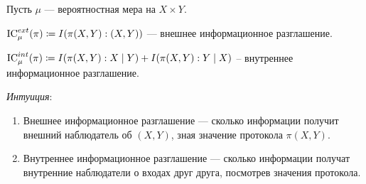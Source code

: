 
\dotfill

\begin{defn}
Пусть $  \mu$ --- вероятностная мера на $ X \times Y$. 

$ \operatorname{IC}_{\mu}^{ext}(\pi) \coloneqq I( \pi(X, Y): (X, Y))$ --- внешнее информационное разглашение.

$ \operatorname{IC}_{\mu}^{int}(\pi) \coloneqq I( \pi(X, Y) : X \mid Y) + I( \pi(X, Y) : Y \mid X) $ -- внутреннее информационное разглашение.
\end{defn}

\textit{Интуиция}: 
\begin{enumerate}
    \item Внешнее информационное разглашение --- сколько информации получит внешний наблюдатель об $(X, Y)$, зная значение протокола $\pi(X, Y)$.
    \item Внутреннее информационное разглашение --- сколько информации получат внутренние  наблюдатели о входах друг друга, посмотрев значения протокола.
\end{enumerate}

